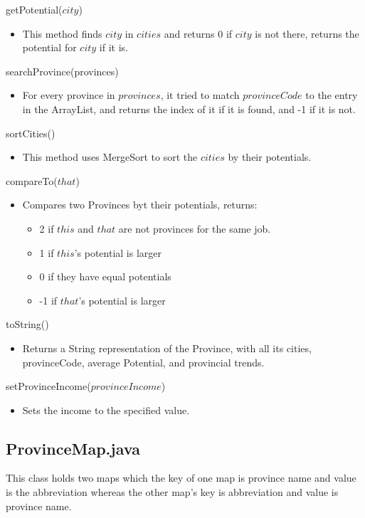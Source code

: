 \documentclass[12pt,fleqn]{article}
\begin{document}
\noindent getPotential($city$)
\begin{itemize}
\item This method finds $city$ in $cities$ and returns 0 if $city$ is not there, returns the potential for $city$ if it is.
\end{itemize}
\noindent searchProvince(provinces)
\begin{itemize}
\item For every province in $provinces$, it tried to match $provinceCode$ to the entry in the ArrayList, and returns the index of it if it is found, and -1 if it is not.
\end{itemize}
\noindent sortCities()
\begin{itemize}
\item This method uses MergeSort to sort the $cities$ by their potentials.
\end{itemize}
\noindent compareTo($that$)
\begin{itemize}
\item Compares two Provinces byt their potentials, returns:
\begin{itemize}
\item 2 if $this$ and $that$ are not provinces for the same job.
\item 1 if $this$'s potential is larger
\item 0 if they have equal potentials
\item -1 if $that$'s potential is larger
\end{itemize}
\end{itemize}
\noindent toString()
\begin{itemize}
\item Returns a String representation of the Province, with all its cities, provinceCode, average Potential, and provincial trends.
\end{itemize}
\noindent setProvinceIncome($provinceIncome$)
\begin{itemize}
\item Sets the income to the specified value.
\end{itemize}


\subsection*{ProvinceMap.java}\label{provmap}
This class holds two maps which the key of one map is province name and value is the abbreviation
whereas the other map’s key is abbreviation and value is province name.
\end{document}
